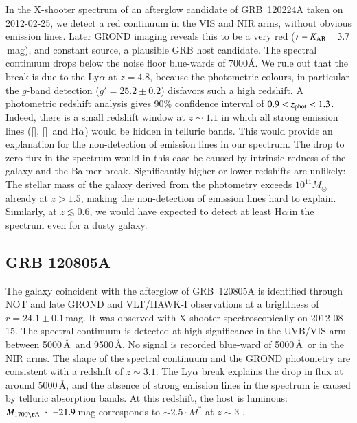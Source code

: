 \documentclass[traditabstract, longauth]{aa}
\newcommand{\ha}{H$\alpha$}
\newcommand{\oii}{[\ion{O}{ii}]}
\newcommand{\oiii}{[\ion{O}{iii}]}
\newcommand{\Msun}{$M_\odot$}
\begin{document}
\begin{appendix}
In the X-shooter spectrum  \citep{2012GCN..12991...1W} of an afterglow candidate of GRB~120224A \citep{2012GCN..12980...1S} taken on 2012-02-25, we detect a red continuum in the VIS and NIR arms, without obvious emission lines. Later GROND imaging reveals this to be a very red ($r-K_{\rm{AB}}=3.7$\,mag), and constant source, a plausible GRB host candidate. The spectral continuum drops below the noise floor blue-wards of 7000\AA. We rule out that the break is due to the Ly$\alpha$ at $z=4.8$, because the photometric colours, in particular the $g$-band detection ($g'=25.2\pm0.2$) disfavors such a high redshift. A photometric redshift analysis gives 90\% confidence interval of $0.9 < z_{\rm{phot}} < 1.3$. Indeed, there is a small redshift window at $z\sim1.1$ in which all strong emission lines (\oii, \oiii\, and \ha) would be hidden in telluric bands. This would provide an explanation for the non-detection of emission lines in our spectrum. The drop to zero flux in the spectrum would in this case be caused by intrinsic redness of the galaxy and the Balmer break. Significantly higher or lower redshifts are unlikely: The stellar mass of the galaxy derived from the photometry exceeds $10^{11}$\Msun\,already at $z > 1.5$, making the non-detection of emission lines hard to explain. Similarly, at $z \lesssim 0.6$, we would have expected to detect at least \ha\,in the spectrum even for a dusty galaxy.

\subsection{GRB 120805A}

The galaxy coincident with the afterglow \citep{2012GCN..13651...1G, 2012GCN..13591...1G} of GRB~120805A \citep{2012GCN..13588...1T} is identified through NOT \citep{2012GCN..13639...1M} and late GROND and VLT/HAWK-I observations at a brightness of $r=24.1\pm0.1$\,mag. It was observed with X-shooter spectroscopically on 2012-08-15. The spectral continuum is detected at high significance in the UVB/VIS arm between 5000\,\AA\, and 9500\,\AA. No signal is recorded blue-ward of 5000\,\AA\, or in the NIR arms. The shape of the spectral continuum and the GROND photometry are consistent with a redshift of $z\sim3.1$. The Ly$\alpha$ break explains the drop in flux at around 5000\,\AA, and the absence of strong emission lines in the spectrum is caused by telluric absorption bands. At this redshift, the host is luminous: $M_{\rm1700\AA\,}\sim-21.9$\,mag corresponds to $\sim2.5\cdot M^{*}$ at $z\sim3$ \citep[e.g.,][]{2009ApJ...692..778R}.


\end{appendix}
\end{document}

